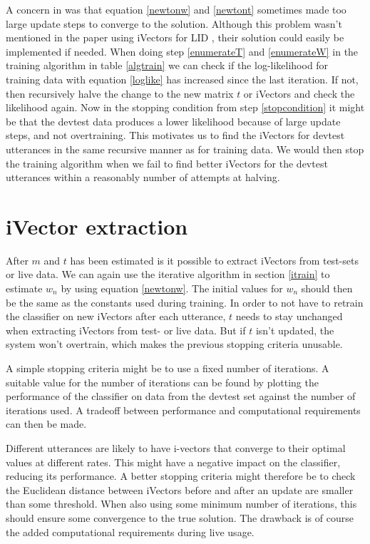 A concern in \cite{sviVector} was that equation \ref{newtonw} and \ref{newtont} sometimes made too large update steps to converge to the solution. Although this problem wasn't mentioned in the paper using iVectors for LID \cite{liiVector}, their solution could easily be implemented if needed. When doing step \ref{enumerateT} and \ref{enumerateW} in the training algorithm in table \ref{algtrain} we can check if the log-likelihood for training data with equation \ref{loglike} has increased since the last iteration. If not, then recursively halve the change to the new matrix $t$ or iVectors and check the likelihood again. Now in the stopping condition from step \ref{stopcondition} it might be that the devtest data produces a lower likelihood because of large update steps, and not overtraining. This motivates us to find the iVectors for devtest utterances in the same recursive manner as for training data. We would then stop the training algorithm when we fail to find better iVectors for the devtest utterances within a reasonably number of attempts at halving.

\section{iVector extraction}

After $m$ and $t$ has been estimated is it possible to extract iVectors from test-sets or live data. We can again use the iterative algorithm in section \ref{itrain} to estimate $w_n$ by using equation \ref{newtonw}. The initial values for $w_n$ should then be the same as the constants used during training. In order to not have to retrain the classifier on new iVectors after each utterance, $t$ needs to stay unchanged when extracting iVectors from test- or live data. But if  $t$ isn't updated, the system won't overtrain, which makes the previous stopping criteria unusable. 

A simple stopping criteria might be to use a fixed number of iterations. A suitable value for the number of iterations can be found by plotting the performance of the classifier on data from the devtest set against the number of iterations used. A tradeoff between performance and computational requirements can then be made. 

Different utterances are likely to have i-vectors that converge to their optimal values at different rates. This might have a negative impact on the classifier, reducing its performance. A better stopping criteria might therefore be to check the Euclidean distance between iVectors before and after an update are smaller than some threshold. When also using some minimum number of iterations, this should ensure some convergence to the true solution. The drawback is of course the added computational requirements during live usage.

